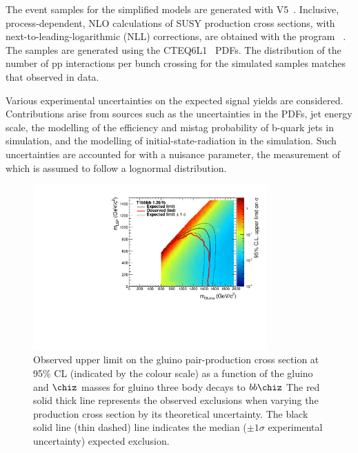 The event samples for the simplified models are generated 
with \MADGRAPH V5~\cite{madgraph}.
Inclusive, process-dependent, NLO
calculations of SUSY production cross sections, with
next-to-leading-logarithmic (NLL) corrections, are obtained with the
program \PROSPINO~\cite{Beenakker:1996ch, PhysRevD.80.095004,PhysRevLett.102.111802, PhysRevD.80.095004, 1126-6708-2009-12-041,
  doi:10.1142/S0217751X11053560, susy-nlo-nll}. The samples are
generated using the CTEQ6L1~\cite{Pumplin:2002vw} PDFs. The
distribution of the number of pp interactions per bunch crossing for
the simulated samples matches that observed in data.

Various experimental uncertainties on the expected signal yields are
considered. Contributions arise from sources such as the uncertainties in the PDFs, jet energy
scale, the modelling of the efficiency and mistag probability of
b-quark jets in simulation, and the modelling of initial-state-radiation in the simulation.
Such uncertainties are accounted for with a nuisance parameter, the measurement 
of which is assumed to follow a lognormal distribution.

\begin{figure}[tbhp]

  \begin{center}
    \includegraphics[width=0.8\textwidth]{xs_contour_withHisto.pdf}
    \caption{Observed upper limit on the gluino pair-production cross section at 95\% CL (indicated by the colour scale) as a function of the gluino
      and $\chiz$ masses for gluino three body decays to $bb\chiz$
      The red solid thick line represents the observed exclusions when
      varying the production cross section by its theoretical uncertainty. 
      The black solid line (thin dashed) line indicates the median (${\pm}1 \sigma$ 
      experimental uncertainty) expected exclusion.
      \label{fig:limits-sms} }
  \end{center}
\end{figure}


